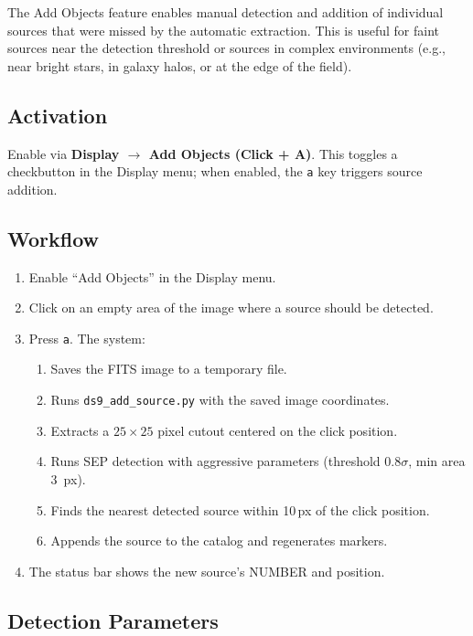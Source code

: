 \documentclass[11pt,fleqn]{book}
\begin{document}
The Add Objects feature enables manual detection and addition of individual sources that were missed by the automatic extraction. This is useful for faint sources near the detection threshold or sources in complex environments (e.g., near bright stars, in galaxy halos, or at the edge of the field).

\subsection{Activation}

Enable via \textbf{Display $\to$ Add Objects (Click + A)}. This toggles a checkbutton in the Display menu; when enabled, the \texttt{a} key triggers source addition.

\subsection{Workflow}

\begin{enumerate}[leftmargin=2em]
  \item Enable ``Add Objects'' in the Display menu.
  \item Click on an empty area of the image where a source should be detected.
  \item Press \texttt{a}. The system:
  \begin{enumerate}
    \item Saves the FITS image to a temporary file.
    \item Runs \texttt{ds9\_add\_source.py} with the saved image coordinates.
    \item Extracts a $25 \times 25$ pixel cutout centered on the click position.
    \item Runs SEP detection with aggressive parameters (threshold $0.8\sigma$, min area 3~px).
    \item Finds the nearest detected source within 10\,px of the click position.
    \item Appends the source to the catalog and regenerates markers.
  \end{enumerate}
  \item The status bar shows the new source's NUMBER and position.
\end{enumerate}

\subsection{Detection Parameters}
\end{document}
